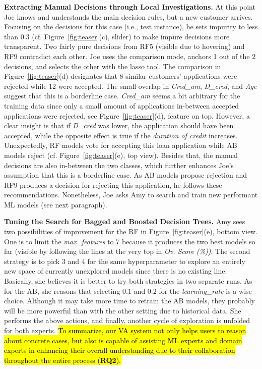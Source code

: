 \textbf{Extracting Manual Decisions through Local Investigations.} At this point Joe knows and understands the main decision rules, but a new customer arrives. 
Focusing on the decisions for this case (i.e.,  test instance), he sets impurity to less than 0.3 (cf. Figure~\ref{fig:teaser}(c), slider) to make impure decisions more transparent. Two fairly pure decisions from RF5 (visible due to hovering) and RF9 contradict each other. Joe uses the comparison mode, anchors 1 out of the 2 decisions, and selects the other with the lasso tool. The comparison in Figure~\ref{fig:teaser}(d) designates that 8 similar customers' applications were rejected while 12 were accepted. The small overlap in \emph{Cred\_am}, \emph{D\_cred}, and \emph{Age} suggest that this is a borderline case. \emph{Cred\_am} seems a bit arbitrary for the training data since only a small amount of applications in-between accepted applications were rejected, see Figure~\ref{fig:teaser}(d), feature on top. However, a clear insight is that if \emph{D\_cred} was lower, the application should have been accepted, while the opposite effect is true if the \emph{duration of credit} increases. Unexpectedly, RF models vote for accepting this loan application while AB models reject (cf. Figure~\ref{fig:teaser}(e), top view). Besides that, the manual decisions are also in-between the two classes, which further enhances Joe's assumption that this is a borderline case. As AB models propose rejection and RF9 produces a decision for rejecting this application, he follows these recommendations. Nonetheless, Joe asks Amy to search and train new performant ML models (see next paragraph).

\textbf{Tuning the Search for Bagged and Boosted Decision Trees.} Amy sees two possibilities of improvement for the RF in Figure~\ref{fig:teaser}(e), bottom view. One is to limit the \emph{max\_features} to 7 because it produces the two best models so far (visible by following the lines at the very top in \emph{Ov. Score (\%))}. The second strategy is to pick 3 and 4 for the same hyperparameter to explore an entirely new space of currently unexplored models since there is no existing line. Basically, she believes it is better to try both strategies in two separate runs. As for the AB, she reasons that selecting 0.1 and 0.2 for the \emph{learning\_rate} is a wise choice. Although it may take more time to retrain the AB models, they probably will be more powerful than with the other setting due to historical data. She performs the above actions, and finally, another cycle of exploration is unfolded for both experts. \hl{To summarize, our VA system not only helps users to reason about concrete cases, but also is capable of assisting ML experts and domain experts in enhancing their overall understanding due to their collaboration throughout the entire process (\textbf{RQ2}).}